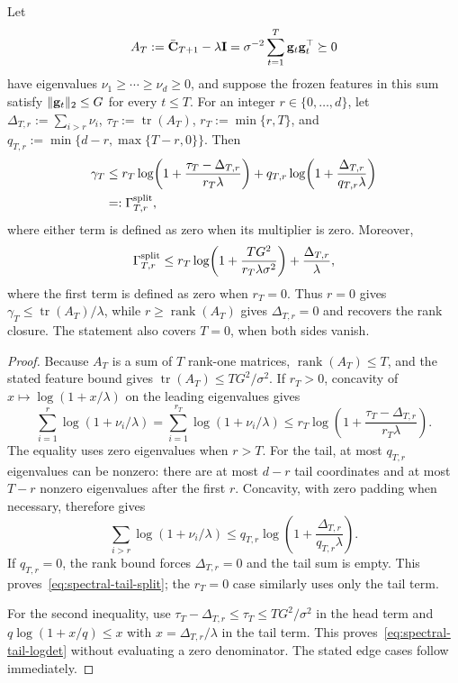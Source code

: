 \begin{lemma}\label{lem:spectral-tail-logdet}
Let
\[
 A_T:=\bar{\mathbf{C}}_{T+1}-\lambda\mathbf{I}
 =\sigma^{-2}\sum_{t=1}^T\mathbf{g}_t\mathbf{g}_t^\top\succeq0
\]
have eigenvalues $\nu_1\ge\cdots\ge\nu_d\ge0$, and suppose the frozen
features in this sum satisfy $\|\mathbf{g}_t\|_2\le G$ for every $t\le T$.
For an integer
$r\in\{0,\ldots,d\}$, let
$\Delta_{T,r}:=\sum_{i>r}\nu_i$, $\tau_T:=\operatorname{tr}(A_T)$,
$r_T:=\min\{r,T\}$, and
$q_{T,r}:=\min\{d-r,\max\{T-r,0\}\}$.  Then
\begin{equation}\label{eq:spectral-tail-split}
\begin{aligned}
 \gamma_T
 &\le r_T\log\!\left(1+\frac{\tau_T-\Delta_{T,r}}
 {r_T\lambda}\right)
 +q_{T,r}\log\!\left(1+\frac{\Delta_{T,r}}
 {q_{T,r}\lambda}\right)\\
 &=:\Gamma^{\rm split}_{T,r},
\end{aligned}
\end{equation}
where either term is defined as zero when its multiplier is zero.  Moreover,
\begin{equation}\label{eq:spectral-tail-logdet}
 \Gamma^{\rm split}_{T,r}\le
 r_T\log\!\left(1+\frac{TG^2}{r_T\lambda\sigma^2}\right)
 +\frac{\Delta_{T,r}}\lambda,
\end{equation}
where the first term is defined as zero when $r_T=0$.  Thus $r=0$ gives
$\gamma_T\le\operatorname{tr}(A_T)/\lambda$, while
$r\ge\operatorname{rank}(A_T)$ gives $\Delta_{T,r}=0$ and recovers the
rank closure.  The statement also covers $T=0$, when both sides vanish.
\end{lemma}
\begin{proof}
Because $A_T$ is a sum of $T$ rank-one matrices,
$\operatorname{rank}(A_T)\le T$, and the stated feature bound gives
$\operatorname{tr}(A_T)\le TG^2/\sigma^2$.  If $r_T>0$, concavity of
$x\mapsto\log(1+x/\lambda)$ on the leading eigenvalues gives
\[
 \sum_{i=1}^{r}\log(1+\nu_i/\lambda)
 =\sum_{i=1}^{r_T}\log(1+\nu_i/\lambda)
 \le r_T\log\!\left(1+
 \frac{\tau_T-\Delta_{T,r}}{r_T\lambda}\right).
\]
The equality uses zero eigenvalues when $r>T$.  For the tail,
at most $q_{T,r}$ eigenvalues can be nonzero: there are at most $d-r$ tail
coordinates and at most $T-r$ nonzero eigenvalues after the first $r$.
Concavity, with zero padding when necessary, therefore gives
\[
 \sum_{i>r}\log(1+\nu_i/\lambda)
 \le q_{T,r}\log\!\left(1+
 \frac{\Delta_{T,r}}{q_{T,r}\lambda}\right).
\]
If $q_{T,r}=0$, the rank bound forces $\Delta_{T,r}=0$ and the tail sum is
empty.  This proves~\eqref{eq:spectral-tail-split}; the $r_T=0$ case similarly
uses only the tail term.

For the second inequality, use
$\tau_T-\Delta_{T,r}\le\tau_T\le TG^2/\sigma^2$ in the head term and
$q\log(1+x/q)\le x$ with $x=\Delta_{T,r}/\lambda$ in the tail term.
This proves~\eqref{eq:spectral-tail-logdet} without evaluating a zero
denominator.  The stated edge cases follow immediately.
\end{proof}

